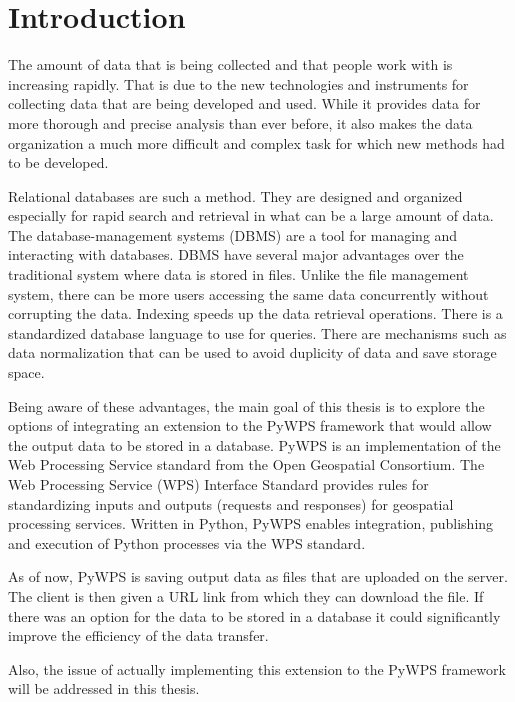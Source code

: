 \chapter{Introduction}
\label{1-introduction}

The amount of data that is being collected and that people work with is increasing rapidly. That is due to the new technologies and instruments for collecting data that are being developed and used. While it provides data for more thorough and precise analysis than ever before, it also makes the data organization a much more difficult and complex task for which new methods had to be developed.

Relational databases are such a method. They are designed and organized especially for rapid search and retrieval in what can be a large amount of data. The database-management systems (DBMS) are a tool for managing and interacting with databases. DBMS have several major advantages over the traditional system where data is stored in files. Unlike the file management system, there can be more users accessing the same data concurrently without corrupting the data. Indexing speeds up the data retrieval operations. There is a standardized database language to use for queries. There are mechanisms such as data normalization that can be used to avoid duplicity of data and save storage space.
	
Being aware of these advantages, the main goal of this thesis is to explore the options of integrating an extension to the PyWPS framework that would allow the output data to be stored in a database. PyWPS is an implementation of the Web Processing Service standard from the Open Geospatial Consortium. The Web Processing Service (WPS) Interface Standard provides rules for standardizing inputs and outputs (requests and responses) for geospatial processing services. Written in Python, PyWPS enables integration, publishing and execution of Python processes via the WPS standard.
	
As of now, PyWPS is saving output data as files that are uploaded on the server. The client is then given a URL link from which they can download the file. If there was an option for the data to be stored in a database it could significantly improve the efficiency of the data transfer. 
 
Also, the issue of actually implementing this extension to the PyWPS framework will be addressed in this thesis.
